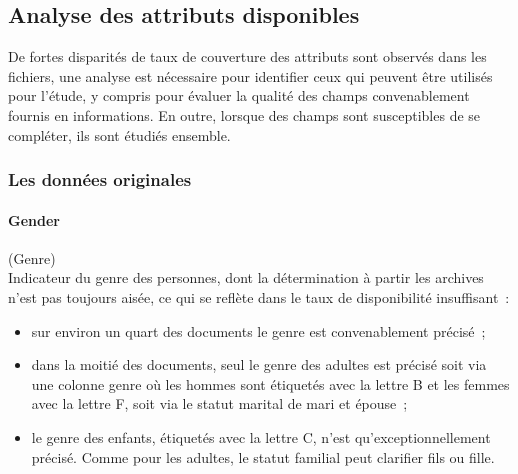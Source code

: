 \documentclass[a4paper,12pt,twoside]{book}
\begin{document}
                    \pagebreak
            
            \subsection{Analyse des attributs disponibles}
                    
                De fortes disparités de taux de couverture des attributs sont observés dans les fichiers, une analyse est nécessaire pour identifier ceux qui peuvent être utilisés pour l'étude, y compris pour évaluer la qualité des champs convenablement fournis en informations. En outre, lorsque des champs sont susceptibles de se compléter, ils sont étudiés ensemble.
                
                \subsubsection{Les données originales}
                
                \paragraph{Gender}\mbox{(Genre)} \\
                \label{genre}
                    Indicateur du genre des personnes, dont la détermination à partir les archives n’est pas toujours aisée, ce qui se reflète dans le taux de disponibilité insuffisant~:
                    \begin{itemize}
                        \item sur environ un quart des documents le genre est convenablement précisé~;
                        \item dans la moitié des documents, seul le genre des adultes est précisé soit via une colonne genre où les hommes sont étiquetés avec la lettre \og{}B\fg{} et les femmes avec la lettre \og{}F\fg{}, soit via le statut marital de mari et épouse~;
                        \item le genre des enfants, étiquetés avec la lettre \og{}C\fg{}, n'est qu'exceptionnellement précisé. Comme pour les adultes, le statut familial peut clarifier \og{}fils\fg{} ou \og{}fille\fg{}.
                    \end{itemize}
                    \medskip
                    
\end{document}
